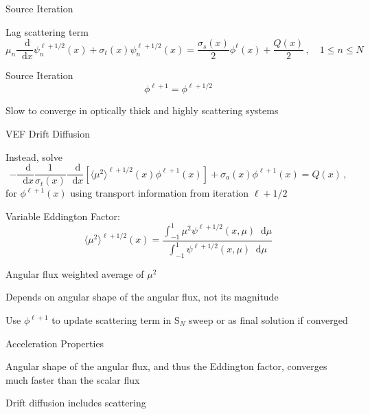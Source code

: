 \documentclass[10pt]{beamer}
\newcommand{\SN}{S$_N$\xspace}
\newcommand{\ud}{\mathop{}\!\mathrm{d}} %
\newcommand{\dderiv}[2]{\frac{\ud #1}{\ud #2}}
\newcommand{\edd}{\langle \mu^2 \rangle}
\newcommand{\relll}{^{\ell+1}} %
\newcommand{\rellh}{^{\ell+1/2}} %
\newcommand{\bracket}[1]{\left[ #1 \right]}
\begin{document}
\begin{frame}{Source Iteration}

	Lag scattering term 
	\begin{equation*} \label{eq:si}
		\mu_n \dderiv{}{x}\psi_n\rellh(x) + \sigma_t(x) \psi_n\rellh(x) = 
		\frac{\sigma_s(x)}{2} \phi^\ell(x) + \frac{Q(x)}{2} \,, \quad 1 \leq n \leq N 
	\end{equation*}

	\pause
	Source Iteration 
	\begin{equation*}
		\phi^{\ell+1} = \phi\rellh
	\end{equation*}

	\pause
	Slow to converge in optically thick and highly scattering systems 

\end{frame}

\begin{frame}{VEF Drift Diffusion}

	Instead, solve 
	\begin{equation*} \label{eq:drift}
	-\dderiv{}{x} \frac{1}{\sigma_t(x)} \dderiv{}{x} \bracket{\edd\rellh(x)\phi\relll(x)} + \sigma_a(x) \phi\relll(x) = Q(x) \,,
	\end{equation*}
	for $\phi\relll(x)$ using transport information from iteration $\ell+1/2$

	\pause 
	Variable Eddington Factor:
	\begin{equation*} \label{eq:eddington} 
		\edd\rellh(x) = \frac{\int_{-1}^1 \mu^2 \psi\rellh(x, \mu) \ud \mu}{\int_{-1}^1 \psi\rellh(x, \mu) \ud \mu}
	\end{equation*}

	\pause
	Angular flux weighted average of $\mu^2$ 

	\pause
	Depends on angular shape of the angular flux, not its magnitude 

	\pause
	Use $\phi\relll$ to update scattering term in \SN sweep or as final solution if converged 

\end{frame}

\begin{frame}{Acceleration Properties}

	Angular shape of the angular flux, and thus the Eddington factor, converges much faster than the scalar flux 

	Drift diffusion includes scattering 



\end{frame}
\end{document}
